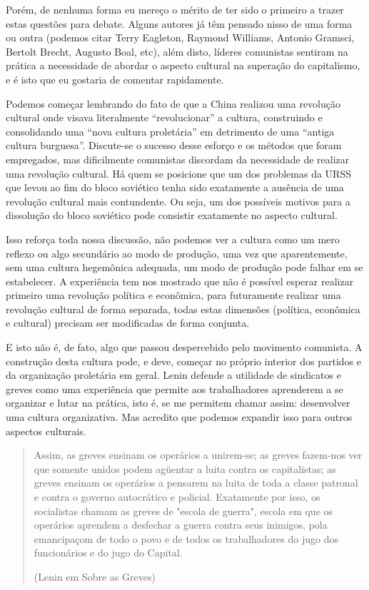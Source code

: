 Porém, de nenhuma forma eu mereço o mérito de ter sido o primeiro a trazer estas questões para debate. Alguns autores já têm pensado nisso de uma forma ou outra (podemos citar Terry Eagleton, Raymond Williams, Antonio Gramsci, Bertolt Brecht, Augusto Boal, etc), além disto, líderes comunistas sentiram na prática a necessidade de abordar o aspecto cultural na superação do capitalismo, e é isto que eu gostaria de comentar rapidamente.

Podemos começar lembrando do fato de que a China realizou uma revolução cultural onde visava literalmente “revolucionar” a cultura, construindo e consolidando uma “nova cultura proletária” em detrimento de uma “antiga cultura burguesa”. Discute-se o sucesso desse esforço e os métodos que foram empregados, mas dificilmente comunistas discordam da necessidade de realizar uma revolução cultural. Há quem se posicione que um dos problemas da URSS que levou ao fim do bloco soviético tenha sido exatamente a ausência de uma revolução cultural mais contundente. Ou seja, um dos possíveis motivos para a dissolução do bloco soviético pode consistir exatamente no aspecto cultural.

Isso reforça toda nossa discussão, não podemos ver a cultura como um mero reflexo ou algo secundário ao modo de produção, uma vez que aparentemente, sem uma cultura hegemônica adequada, um modo de produção pode falhar em se estabelecer. A experiência tem nos mostrado que não é possível esperar realizar primeiro uma revolução política e econômica, para futuramente realizar uma revolução cultural de forma separada, todas estas dimensões (política, econômica e cultural) precisam ser modificadas de forma conjunta.

E isto não é, de fato, algo que passou despercebido pelo movimento comunista. A construção desta cultura pode, e deve, começar no próprio interior dos partidos e da organização proletária em geral. Lenin defende a utilidade de sindicatos e greves como uma experiência que permite aos trabalhadores aprenderem a se organizar e lutar na prática, isto é, se me permitem chamar assim: desenvolver uma cultura organizativa. Mas acredito que podemos expandir isso para outros aspectos culturais.

\begin{quote}
Assim, as greves ensinam os operários a unirem-se; as greves fazem-nos ver que somente unidos podem agüentar a luita contra os capitalistas; as greves ensinam os operários a pensarem na luita de toda a classe patronal e contra o governo autocrático e policial. Exatamente por isso, os socialistas chamam as greves de "escola de guerra", escola em que os operários aprendem a desfechar a guerra contra seus inimigos, pola emancipaçom de todo o povo e de todos os trabalhadores do jugo dos funcionários e do jugo do Capital.

(Lenin em Sobre  as Greves)
\end{quote}

